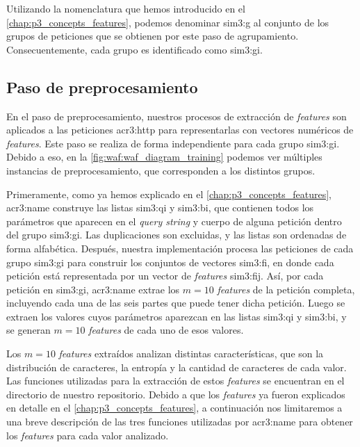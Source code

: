 Utilizando la nomenclatura que hemos introducido en el
\autoref{chap:p3_concepts_features}, podemos denominar \gls{sim3:g} al
conjunto de los grupos de peticiones que se obtienen por este paso de
agrupamiento. Consecuentemente, cada grupo es identificado como \gls{sim3:gi}.


\subsection{Paso de preprocesamiento}

En el paso de preprocesamiento, nuestros procesos de extracción de
\textit{features} son aplicados a las peticiones \gls{acr3:http} para
representarlas con vectores numéricos de \textit{features}.
Este paso se realiza de forma independiente para cada grupo \gls{sim3:gi}.
Debido a eso, en la \autoref{fig:waf:waf_diagram_training} podemos ver
múltiples instancias de preprocesamiento, que corresponden a los distintos
grupos.

Primeramente, como ya hemos explicado en el
\autoref{chap:p3_concepts_features}, \gls{acr3:name} construye las listas
\gls{sim3:qi} y \gls{sim3:bi}, que contienen todos los parámetros que
aparecen en el \textit{query string} y cuerpo de alguna petición dentro
del grupo \gls{sim3:gi}. Las duplicaciones son excluidas, y las listas
son ordenadas de forma alfabética.
Después, nuestra implementación procesa las peticiones de cada grupo
\gls{sim3:gi} para construir los conjuntos de vectores \gls{sim3:fi},
en donde cada petición está representada por un vector de \textit{features}
\gls{sim3:fij}. Así, por cada petición en \gls{sim3:gi}, \gls{acr3:name}
extrae los $m = 10$ \textit{features} de la petición completa, incluyendo
cada una de las seis partes que puede tener dicha petición. Luego se
extraen los valores cuyos parámetros aparezcan en las listas \gls{sim3:qi}
y \gls{sim3:bi}, y se generan $m = 10$ \textit{features} de cada uno de
esos valores.

Los $m = 10$ \textit{features} extraídos analizan distintas características,
que son la distribución de caracteres, la entropía y la cantidad de
caracteres de cada valor. Las funciones utilizadas para la extracción
de estos \textit{features} se encuentran en el directorio
 de nuestro repositorio.
Debido a que los \textit{features} ya fueron explicados en detalle en el
\autoref{chap:p3_concepts_features}, a continuación nos limitaremos a una
breve descripción de las tres funciones utilizadas por \gls{acr3:name}
para obtener los \textit{features} para cada valor analizado.

